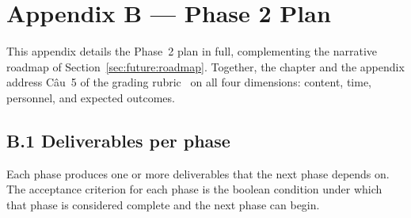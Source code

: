 \chapter*{Appendix B --- Phase 2 Plan}
\label{appendix:plan}

This appendix details the Phase~2 plan in full, complementing the
narrative roadmap of Section~\ref{sec:future:roadmap}. Together,
the chapter and the appendix address Câu~5 of the grading
rubric~\cite{rubric} on all four dimensions: content, time,
personnel, and expected outcomes.

\section*{B.1 Deliverables per phase}

Each phase produces one or more deliverables that the next
phase depends on. The acceptance criterion for each phase is
the boolean condition under which that phase is considered
complete and the next phase can begin.

